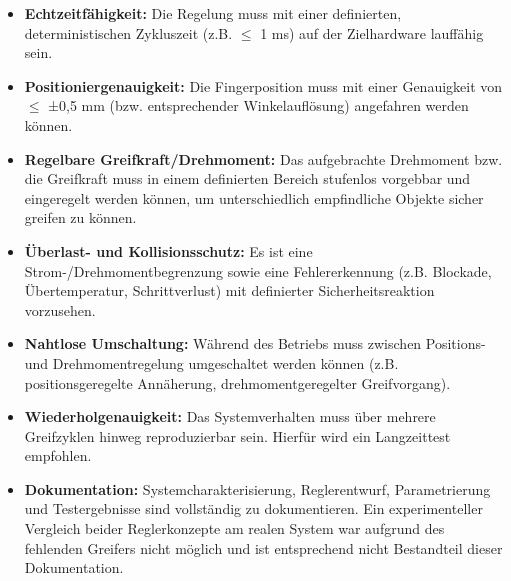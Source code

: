 \begin{itemize}
    \item \textbf{Echtzeitfähigkeit:} Die Regelung muss mit einer definierten, deterministischen Zykluszeit (z.B. \ensuremath{\le} 1 ms) auf der Zielhardware lauffähig sein.
    \item \textbf{Positioniergenauigkeit:} Die Fingerposition muss mit einer Genauigkeit von \ensuremath{\le} ±0,5 mm (bzw. entsprechender Winkelauflösung) angefahren werden können.
    \item \textbf{Regelbare Greifkraft/Drehmoment:} Das aufgebrachte Drehmoment bzw. die Greifkraft muss in einem definierten Bereich stufenlos vorgebbar und eingeregelt werden können, um unterschiedlich empfindliche Objekte sicher greifen zu können.
    \item \textbf{Überlast- und Kollisionsschutz:} Es ist eine Strom-/Drehmomentbegrenzung sowie eine Fehlererkennung (z.B. Blockade, Übertemperatur, Schrittverlust) mit definierter Sicherheitsreaktion vorzusehen.
    \item \textbf{Nahtlose Umschaltung:} Während des Betriebs muss zwischen Positions- und Drehmomentregelung umgeschaltet werden können (z.B. positionsgeregelte Annäherung, drehmomentgeregelter Greifvorgang).
    \item \textbf{Wiederholgenauigkeit:} Das Systemverhalten muss über mehrere Greifzyklen hinweg reproduzierbar sein. Hierfür wird ein Langzeittest empfohlen.
    \item \textbf{Dokumentation:} Systemcharakterisierung, Reglerentwurf, Parametrierung und Testergebnisse sind vollständig zu dokumentieren. Ein experimenteller Vergleich beider Reglerkonzepte am realen System war aufgrund des fehlenden Greifers nicht möglich und ist entsprechend nicht Bestandteil dieser Dokumentation.
\end{itemize}
